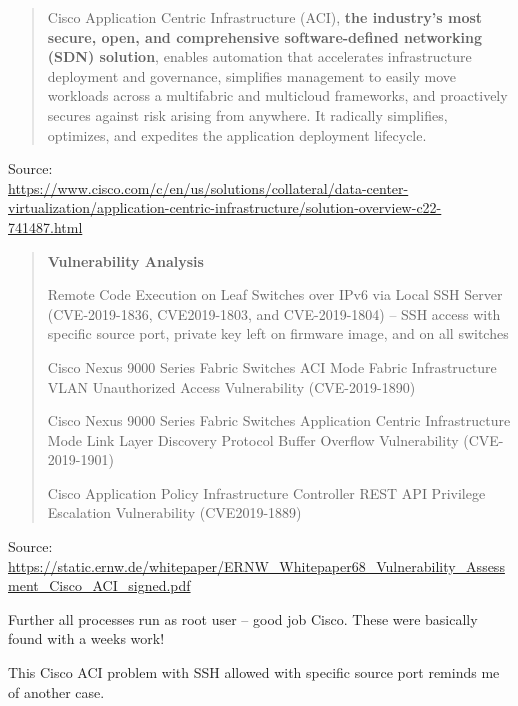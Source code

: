 \documentclass[Screen16to9,17pt]{foils}
\begin{document}


\begin{quote}
Cisco Application Centric Infrastructure (ACI), {\bf the industry’s most secure, open, and comprehensive software-defined networking (SDN) solution}, enables automation that accelerates infrastructure deployment and governance, simplifies management to easily move workloads across a multifabric and multicloud frameworks, and proactively secures against risk arising from anywhere. It radically simplifies, optimizes, and expedites the application deployment lifecycle.
\end{quote}
Source:\\ {\scriptsize\url{https://www.cisco.com/c/en/us/solutions/collateral/data-center-virtualization/application-centric-infrastructure/solution-overview-c22-741487.html}}



\begin{quote}{\bf
Vulnerability Analysis}
\begin{list2}
\item Remote Code Execution on Leaf Switches over IPv6 via Local SSH Server (CVE-2019-1836, CVE2019-1803, and CVE-2019-1804) -- SSH access with specific source port, private key left on firmware image, and on all switches
\item Cisco Nexus 9000 Series Fabric Switches ACI Mode Fabric Infrastructure VLAN Unauthorized Access
Vulnerability (CVE-2019-1890)
\item Cisco Nexus 9000 Series Fabric Switches Application Centric Infrastructure Mode Link Layer Discovery
Protocol Buffer Overflow Vulnerability (CVE-2019-1901)
\item Cisco Application Policy Infrastructure Controller REST API Privilege Escalation Vulnerability (CVE2019-1889)
\end{list2}
\end{quote}
Source:\\
\url{https://static.ernw.de/whitepaper/ERNW_Whitepaper68_Vulnerability_Assessment_Cisco_ACI_signed.pdf}

\vskip 5mm
Further all processes run as root user -- good job Cisco. These were basically found with a weeks work!


This Cisco ACI problem with SSH allowed with specific source port reminds me of another case.
\end{document}
